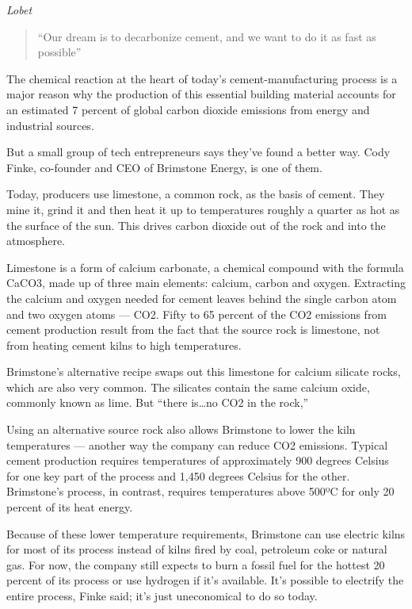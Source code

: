 \documentclass[
]{book}
\begin{document}
\emph{Lobet}

\begin{quote}
``Our dream is to decarbonize cement, and we want to do it as fast as possible''
\end{quote}

The chemical reaction at the heart of today's cement-manufacturing process is a major reason why the production of this essential building material accounts for an estimated 7 percent of global carbon dioxide emissions from energy and industrial sources.

But a small group of tech entrepreneurs says they've found a better way. Cody Finke, co-founder and CEO of Brimstone Energy, is one of them.

Today, producers use limestone, a common rock, as the basis of cement. They mine it, grind it and then heat it up to temperatures roughly a quarter as hot as the surface of the sun. This drives carbon dioxide out of the rock and into the atmosphere.

Limestone is a form of calcium carbonate, a chemical compound with the formula CaCO3, made up of three main elements: calcium, carbon and oxygen. Extracting the calcium and oxygen needed for cement leaves behind the single carbon atom and two oxygen atoms --- CO2. Fifty to 65 percent of the CO2 emissions from cement production result from the fact that the source rock is limestone, not from heating cement kilns to high temperatures.

Brimstone's alternative recipe swaps out this limestone for calcium silicate rocks, which are also very common. The silicates contain the same calcium oxide, commonly known as lime. But \hspace{0pt}``there is\ldots no CO2 in the rock,''

Using an alternative source rock also allows Brimstone to lower the kiln temperatures --- another way the company can reduce CO2 emissions. Typical cement production requires temperatures of approximately 900 degrees Celsius for one key part of the process and 1,450 degrees Celsius for the other. Brimstone's process, in contrast, requires temperatures above 500ºC for only 20 percent of its heat energy.

Because of these lower temperature requirements, Brimstone can use electric kilns for most of its process instead of kilns fired by coal, petroleum coke or natural gas.
For now, the company still expects to burn a fossil fuel for the hottest 20 percent of its process or use hydrogen if it's available. It's possible to electrify the entire process, Finke said; it's just uneconomical to do so today.
\end{document}
